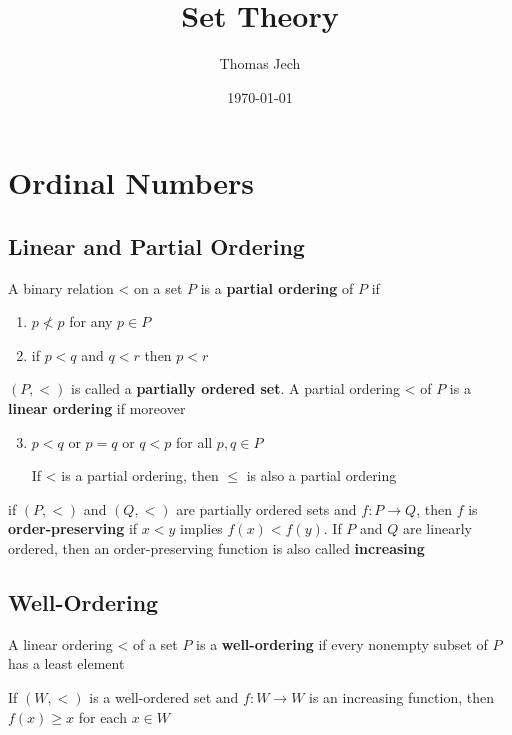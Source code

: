 \documentclass[11pt]{article}
\author{Thomas Jech}
\date{\today}
\title{Set Theory}
\begin{document}
\maketitle
\tableofcontents


\section{Ordinal Numbers}
\label{sec:org0d44a6d}

\subsection{Linear and Partial Ordering}
\label{sec:org020778f}
\begin{definition}[]
A binary relation < on a set \(P\) is a \textbf{partial ordering} of \(P\) if
\begin{enumerate}
\item \(p\not<p\) for any \(p\in P\)
\item if \(p<q\) and \(q<r\) then \(p<r\)
\end{enumerate}


\((P,<)\) is called a \textbf{partially ordered set}. A partial ordering < of \(P\) is a \textbf{linear ordering}
if moreover
\begin{enumerate}
\setcounter{enumi}{2}
\item \(p<q\) or \(p=q\) or \(q<p\) for all \(p,q\in P\)

If < is a partial ordering, then \(\le\) is also a partial ordering
\end{enumerate}
\end{definition}

if \((P,<)\) and \((Q,<)\) are partially ordered sets and \(f:P\to Q\), then \(f\) is
\textbf{order-preserving} if \(x<y\) implies \(f(x)<f(y)\). If \(P\) and \(Q\) are linearly ordered, then
an order-preserving function is also called \textbf{increasing}

\subsection{Well-Ordering}
\label{sec:org9f139bc}
\begin{definition}[]
A linear ordering < of a set \(P\) is a \textbf{well-ordering} if every nonempty subset of \(P\) has a
least element
\end{definition}

\begin{lemma}[]
\label{lemma2.4}
If \((W,<)\) is a well-ordered set and \(f:W\to W\) is an increasing function, then \(f(x)\ge x\)
for each \(x\in W\)
\end{lemma}
\end{document}
